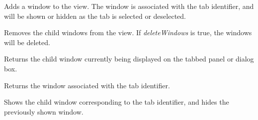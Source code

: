 Adds a window to the view. The window is associated with the tab identifier, and will be shown or hidden as the tab
is selected or deselected.



Removes the child windows from the view. If {\it deleteWindows} is true, the windows will be deleted.



Returns the child window currently being displayed on the tabbed panel or dialog box.



Returns the window associated with the tab identifier.



Shows the child window corresponding to the tab identifier, and hides the previously shown window.


